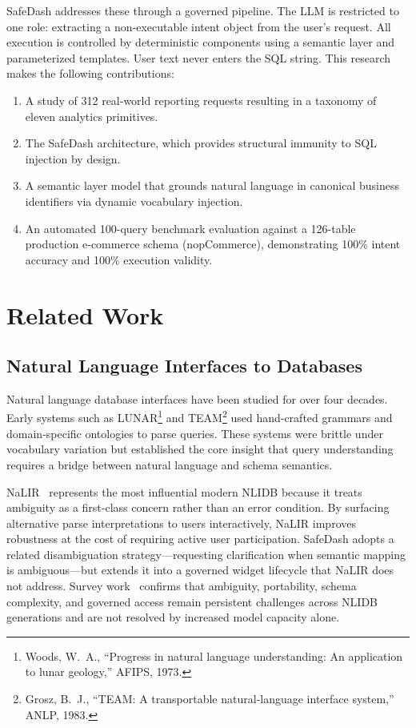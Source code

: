 \documentclass[11pt]{article}
\begin{document}
SafeDash addresses these through a governed pipeline. The LLM is restricted to one role: extracting a non‑executable intent object from the user's request. All execution is controlled by deterministic components using a semantic layer and parameterized templates. User text never enters the SQL string. This research makes the following contributions:
\begin{enumerate}
  \item A study of 312 real‑world reporting requests resulting in a taxonomy of eleven analytics primitives.
  \item The SafeDash architecture, which provides structural immunity to SQL injection by design.
  \item A semantic layer model that grounds natural language in canonical business identifiers via dynamic vocabulary injection.
  \item An automated 100-query benchmark evaluation against a 126-table production e‑commerce schema (nopCommerce), demonstrating 100\% intent accuracy and 100\% execution validity.
\end{enumerate}

\section{Related Work}
\subsection{Natural Language Interfaces to Databases}
Natural language database interfaces have been studied for over four decades. Early systems such as LUNAR\footnote{Woods, W.~A., ``Progress in natural language understanding: An application to lunar geology,'' AFIPS, 1973.} and TEAM\footnote{Grosz, B.~J., ``TEAM: A transportable natural‑language interface system,'' ANLP, 1983.} used hand‑crafted grammars and domain‑specific ontologies to parse queries. These systems were brittle under vocabulary variation but established the core insight that query understanding requires a bridge between natural language and schema semantics.

NaLIR~\cite{li2014nalir} represents the most influential modern NLIDB because it treats ambiguity as a first‑class concern rather than an error condition. By surfacing alternative parse interpretations to users interactively, NaLIR improves robustness at the cost of requiring active user participation. SafeDash adopts a related disambiguation strategy—requesting clarification when semantic mapping is ambiguous—but extends it into a governed widget lifecycle that NaLIR does not address. Survey work~\cite{affolter2019survey,liu2026systematic} confirms that ambiguity, portability, schema complexity, and governed access remain persistent challenges across NLIDB generations and are not resolved by increased model capacity alone.
\end{document}
